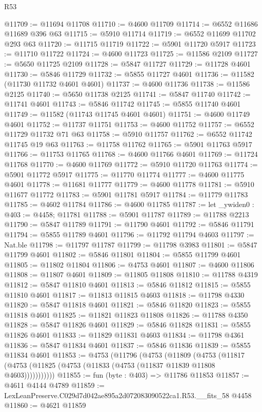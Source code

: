 \begin{lexlean}{R53}
\begin{coremodule}
@11709 := @11694 @11708
@11710 := @4600 @11709
@11714 := @6552 @11686 @11689 @396 @63
@11715 := @5910 @11714
@11719 := @6552 @11699 @11702 @293 @63
@11720 := @11715 @11719
@11722 := @5901 @11720 @5917
@11723 := @11710 @11722
@11724 := @4600 @11723
@11725 := @11586 @2109
@11727 := @5650 @11725 @2109
@11728 := @5847 @11727
@11729 := @11728 @4601
@11730 := @5846 @11729
@11732 := @5855 @11727 @4601
@11736 := @11582 (@11730 @11732 @4601 @4601)
@11737 := @4600 @11736
@11738 := @11586 @2125
@11740 := @5650 @11738 @2125
@11741 := @5847 @11740
@11742 := @11741 @4601
@11743 := @5846 @11742
@11745 := @5855 @11740 @4601
@11749 := @11582 (@11743 @11745 @4601 @4601)
@11751 := @4600 @11749 @4601
@11752 := @11737 @11751
@11753 := @4600 @11752
@11757 := @6552 @11729 @11732 @71 @63
@11758 := @5910 @11757
@11762 := @6552 @11742 @11745 @19 @63
@11763 := @11758 @11762
@11765 := @5901 @11763 @5917
@11766 := @11753 @11765
@11768 := @4600 @11766 @4601
@11769 := @11724 @11768
@11770 := @4600 @11769
@11772 := @5910 @11720 @11763
@11774 := @5901 @11772 @5917
@11775 := @11770 @11774
@11777 := @4600 @11775 @4601
@11778 := @11681 @11777
@11779 := @4600 @11778
@11781 := @5910 @11677 @11772
@11783 := @5901 @11781 @5917
@11784 := @11779 @11783
@11785 := @4602 @11784
@11786 := @4600 @11785
@11787 := let _ywiden0 : @403 := @4458; @11781
@11788 := @5901 @11787
@11789 := @11788 @2213
@11790 := @5847 @11789
@11791 := @11790 @4601
@11792 := @5846 @11791
@11794 := @5855 @11789 @4601
@11796 := @11792 @11794 @4603
@11797 := Nat.ble
@11798 := @11797 @11787
@11799 := @11798 @3983
@11801 := @5847 @11799 @4601
@11802 := @5846 @11801
@11804 := @5855 @11799 @4601
@11805 := @11802 @11804
@11806 := @4753 @4601
@11807 := @4600 @11806
@11808 := @11807 @4601
@11809 := @11805 @11808
@11810 := @11788 @4319
@11812 := @5847 @11810 @4601
@11813 := @5846 @11812
@11815 := @5855 @11810 @4601
@11817 := @11813 @11815 @4603
@11818 := @11798 @4330
@11820 := @5847 @11818 @4601
@11821 := @5846 @11820
@11823 := @5855 @11818 @4601
@11825 := @11821 @11823 @11808
@11826 := @11788 @4350
@11828 := @5847 @11826 @4601
@11829 := @5846 @11828
@11831 := @5855 @11826 @4601
@11833 := @11829 @11831 @4603
@11834 := @11798 @4361
@11836 := @5847 @11834 @4601
@11837 := @5846 @11836
@11839 := @5855 @11834 @4601
@11853 := @4753
    (@11796
      (@4753
        (@11809
          (@4753 (@11817 (@4753 (@11825 (@4753 (@11833 (@4753 (@11837 @11839 @11808 @4603)))))))))))
@11855 := fun (byte : @403) => @11786 @11853
@11857 := @4611 @4144 @4789
@11859 := LexLeanPreserve.C029d7d042ae895a2d072083090522ca1.R53.__fits_58 @4458
@11860 := @4621 @11859

\end{coremodule}
\end{lexlean}

